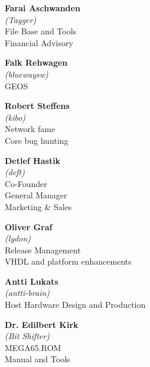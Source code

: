 \begin{mega65thanks}
\begin{minipage}{\linewidth}
    {\large\bf Farai Aschwanden} \\
    \textit{(Tayger)} \\
    File Base and Tools \\
    Financial Advisory
\end{minipage}

\begin{minipage}{\linewidth}
    {\large\bf Falk Rehwagen} \\
    \textit{(bluewaysw)} \\
    GEOS
\end{minipage}

\begin{minipage}{\linewidth}
    {\large\bf Robert Steffens} \\
    \textit{(kibo)} \\
    Network fame \\
    Core bug hunting
\end{minipage}

\begin{minipage}{\linewidth}
    {\large\bf Detlef Hastik} \\
    \textit{(deft)} \\
    Co-Founder \\
    General Manager \\
    Marketing \& Sales
\end{minipage}

\begin{minipage}{\linewidth}
    {\large\bf Oliver Graf} \\
    \textit{(lydon)} \\
    Release Management \\
    VHDL and platform enhancements
\end{minipage}

\begin{minipage}{\linewidth}
    {\large\bf Antti Lukats} \\
    \textit{(antti-brain)} \\
    Host Hardware Design and Production
\end{minipage}

\begin{minipage}{\linewidth}
    {\large\bf Dr. Edilbert Kirk} \\
    \textit{(Bit Shifter)} \\
    MEGA65.ROM \\
    Manual and Tools
\end{minipage}


\end{mega65thanks}
